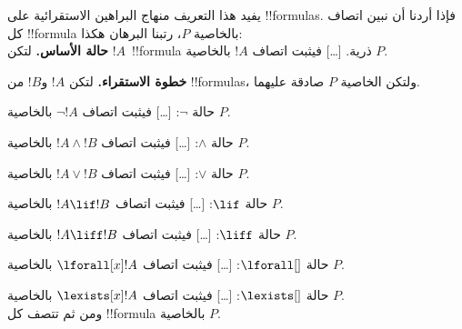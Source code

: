 \documentclass[../../../include/open-logic-section]{subfiles}
\begin{document}
\begin{explain}
يفيد هذا التعريف منهاج البراهين الاستقرائية على !!{formula}s. فإذا أردنا
أن نبين اتصاف كل !!{formula} بالخاصية $P$، رتبنا البرهان هكذا:\\

\textbf{حالة الأساس.} لتكن $!A$~!!{formula} ذرية. [\ldots]
فيثبت اتصاف $!A$ بالخاصية $P$.

\textbf{خطوة الاستقراء.} لتكن $!A$ و$!B$ من !!{formula}s، ولتكن
الخاصية $P$ صادقة عليهما.

حالة $\lnot$: [\ldots] فيثبت اتصاف $\lnot !A$ بالخاصية $P$.

حالة $\land$: [\ldots] فيثبت اتصاف $!A \land !B$ بالخاصية $P$.

حالة $\lor$: [\ldots] فيثبت اتصاف $!A \lor !B$ بالخاصية $P$.

حالة $\lif$: [\ldots] فيثبت اتصاف $!A \lif !B$ بالخاصية $P$.

حالة $\liff$: [\ldots] فيثبت اتصاف $!A \liff !B$ بالخاصية $P$.

حالة $\lforall[]$: [\ldots] فيثبت اتصاف $\lforall[x] !A$ بالخاصية $P$.

حالة $\lexists[]$: [\ldots] فيثبت اتصاف $\lexists[x] !A$ بالخاصية $P$. \\

ومن ثم تتصف كل !!{formula} بالخاصية $P$.
\end{explain}
\end{document}

